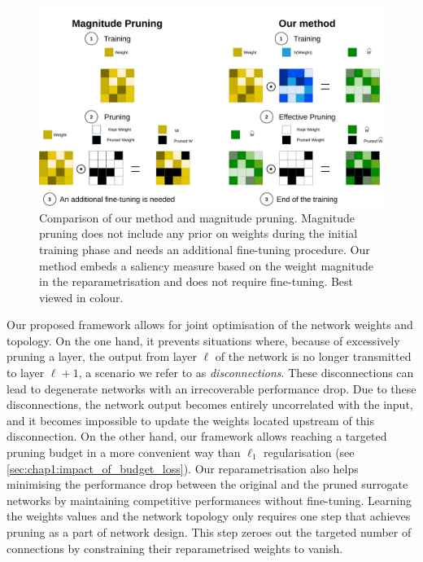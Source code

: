 \begin{figure}[ht]
  \centerline{\includegraphics[width=12.5cm]{chapter_1/assets/comparison_reparam_vs_mag_pruning.pdf}}
  \caption{Comparison of our method and magnitude pruning. Magnitude pruning
  does not include any prior on weights during the initial training phase and
  needs an additional fine-tuning procedure. Our method embeds a saliency
  measure based on the weight magnitude in the reparametrisation and does not
  require fine-tuning. Best viewed in colour.}
  \label{fig:chap1:comparison_reparam_vs_mag_pruning}
\end{figure}


Our proposed framework allows for joint optimisation of the network weights and
topology. On the one hand, it prevents situations where, because of excessively
pruning a layer, the output from layer $\ell$ of the network is no longer
transmitted to layer $\ell+1$, a scenario we refer to as \emph{disconnections}.
These disconnections can lead to degenerate networks with an irrecoverable
performance drop. Due to these disconnections, the network output becomes
entirely uncorrelated with the input, and it becomes impossible to update the
weights located upstream of this disconnection. On the other hand, our framework
allows reaching a targeted pruning budget in a more convenient way than $\ell_1$
regularisation (see \cref{sec:chap1:impact_of_budget_loss}). Our
reparametrisation also helps minimising the performance drop between the
original and the pruned surrogate networks by maintaining competitive
performances without fine-tuning. Learning the weights values and the network
topology only requires one step that achieves pruning as a part of network
design. This step zeroes out the targeted number of connections by constraining
their reparametrised weights to vanish.


